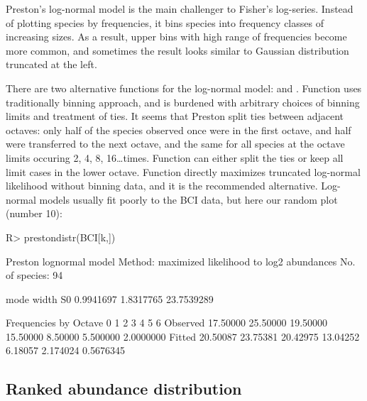 \documentclass[article,nojss]{jss}
\begin{document}
Preston's log-normal model is the main challenger to Fisher's
log-series.  Instead of plotting species by frequencies, it bins
species into frequency classes of increasing sizes.  As a result,
upper bins with high range of frequencies become more common, and
sometimes the result looks similar to Gaussian distribution truncated
at the left.

There are two alternative functions for the log-normal model:
 and .  Function
 uses traditionally binning approach, and is burdened
with arbitrary choices of binning limits and treatment of ties. It
seems that Preston split ties between adjacent octaves: only half of
the species observed once were in the first octave, and half were
transferred to the next octave, and the same for all species at the
octave limits occuring 2, 4, 8, 16\ldots times. Function
 can either split the ties or keep all limit cases in
the lower octave.
Function  directly
maximizes truncated log-normal likelihood without binning data, and it
is the recommended alternative.  Log-normal models  usually fit poorly
to the BCI data, but here our random plot (number 10):
\begin{Schunk}
\begin{Sinput}
R> prestondistr(BCI[k,])
\end{Sinput}
\begin{Soutput}
Preston lognormal model
Method: maximized likelihood to log2 abundances 
No. of species: 94 

      mode      width         S0 
 0.9941697  1.8317765 23.7539289 

Frequencies by Octave
                0        1        2        3       4        5         6
Observed 17.50000 25.50000 19.50000 15.50000 8.50000 5.500000 2.0000000
Fitted   20.50087 23.75381 20.42975 13.04252 6.18057 2.174024 0.5676345
\end{Soutput}
\end{Schunk}

\subsection{Ranked abundance distribution}
\end{document}
